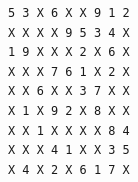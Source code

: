 \begin{Verbatim}[fontsize=\small, frame=single]
5 3 X 6 X X 9 1 2
X X X X 9 5 3 4 X
1 9 X X X 2 X 6 X
X X X 7 6 1 X 2 X
X X 6 X X 3 7 X X
X 1 X 9 2 X 8 X X
X X 1 X X X X 8 4
X X X 4 1 X X 3 5
X 4 X 2 X 6 1 7 X
\end{Verbatim}
